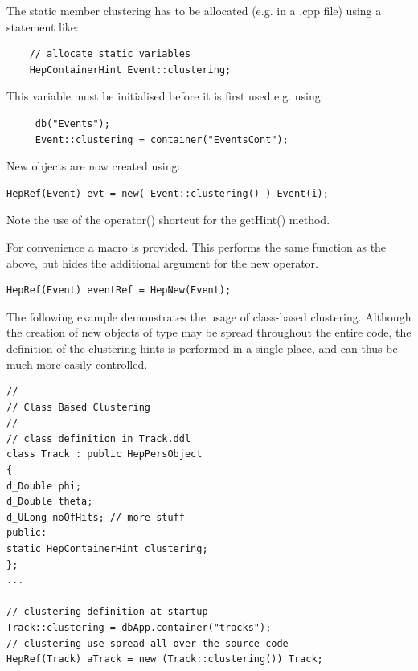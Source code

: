 \par
 
The static member clustering has to be allocated (e.g. in a .cpp file) using a statement like:

\begin{verbatim}
    // allocate static variables 
    HepContainerHint Event::clustering; 
\end{verbatim}

\par
This variable must
be initialised before it is first used e.g. using:
\begin{verbatim}
     db("Events"); 
     Event::clustering = container("EventsCont"); 
\end{verbatim}

\par

New  objects are now created using:
\begin{verbatim}
HepRef(Event) evt = new( Event::clustering() ) Event(i);
\end{verbatim}

\par
Note the use of the operator() shortcut for the getHint() method.
\par

For convenience a  macro is provided. This performs
the same function as the above, but hides the additional argument for the new operator.
\begin{verbatim}
HepRef(Event) eventRef = HepNew(Event);
\end{verbatim}

\par

The following example demonstrates the usage of class-based clustering.
Although the creation of new objects of type  may be
spread throughout the entire code, the definition of the clustering
hints is performed in a single place, and can thus be much more easily controlled.

\begin{verbatim}
//
// Class Based Clustering
//
// class definition in Track.ddl 
class Track : public HepPersObject 
{ 
d_Double phi; 
d_Double theta; 
d_ULong noOfHits; // more stuff 
public: 
static HepContainerHint clustering;
}; 
... 

// clustering definition at startup 
Track::clustering = dbApp.container("tracks"); 
// clustering use spread all over the source code 
HepRef(Track) aTrack = new (Track::clustering()) Track;

\end{verbatim}

